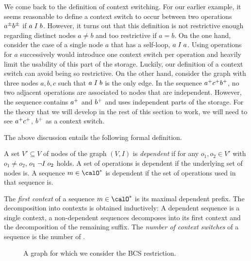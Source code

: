\documentclass[../../diss.tex]{subfiles}
\begin{document}
We come back to the definition of context switching.
For our earlier example, it seems reasonable to define a context switch to occur between two operations ${a}^\pm{b}^\pm$ if $a \mathrel{I} b$.
However, it turns out that this definition is not restrictive enough regarding distinct nodes $a \neq b$ and too restrictive if $a = b$.
On the one hand, consider the case of a single node $a$ that has a self-loop, $a \mathrel{I} a$.
Using operations for $a$ successively would introduce one context switch per operation and heavily limit the usability of this part of the storage.
Luckily, our definition of a context switch can avoid being so restrictive.
On the other hand, consider the graph with three nodes $a,b,c$ such that $a \mathrel{I} b$ is the only edge.
In the sequence ${a}^+{c}^+{b}^+$, no two adjacent operations are associated to nodes that are independent.
However, the sequence contains ${a}^+$ and ${b}^+$ and uses independent parts of the storage.
For the theory that we will develop in the rest of this section to work, we will need to see ${a}^+{c}^+$, ${b}^+$ as a context switch.

The above discussion entails the following formal definition.

\begin{definition}
    A set $V' \subseteq V$ of nodes of the graph $(V,I)$ is \emph{dependent} if for any $o_1, o_2 \in V'$ with $o_1 \neq o_2$, $o_1 \mathrel{\neg I} o_2$ holds.
    A set of operations is dependent if the underlying set of nodes is.
    A sequence $m \in \ops^*$ is dependent if the set of operations used in that sequence is.

    The \emph{first context} of a sequence $m \in \ops^*$ is its maximal dependent prefix.
    The decomposition into contexts is obtained inductively:
    A dependent sequence is a single context, a non-dependent sequences decomposes into its first context and the decomposition of the remaining suffix.
    The \emph{number of context switches} of a sequence is the number of .
\end{definition}

\begin{figure}[t]
    \centering%
    \caption{A graph for which we consider the BCS restriction.}%
    \label{Figure:ValenceBCSExampleGraph}%
\end{figure}
\end{document}
